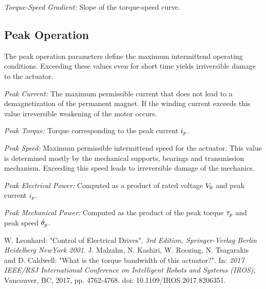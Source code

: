 \documentclass[a4paper,10pt]{cjtdsheet}      %
\begin{document}
\begin{multicols}{2}
\emph{Torque-Speed Gradient:} Slope of the torque-speed curve.

%
%
\subsection*{Peak Operation}
The peak operation parameters define the maximum intermittend operating conditions. Exceeding these values even for short time yields irriversible damage to the actuator.

\emph{Peak Current:} The maximum permissible current that does not lead to a demagnetization of the permanent magnet. If the winding current exceeds this value irreversible weakening of the motor occurs.

\emph{Peak Torque:} Torque corresponding to the peak current $i_p$.

\emph{Peak Speed:} Maximum permissible intermittend speed for the actuator. This value is determined mostly by the mechanical supports, bearings and transmission mechanism. Exceeding this speed leads to irreversible damage of the mechanics.

\emph{Peak Electrical Power:} Computed as a product of rated voltage $V_0$ and peak current $i_p$.

\emph{Peak Mechanical Power:} Computed as the product of the peak torque $\tau_p$ and peak speed $\dot{\theta}_p$.

\end{multicols}





\begin{thebibliography}{99}
%
W. Leonhard: 
\newblock "Control of Electrical Drives". 
\newblock \textit{3rd Edition, Springer-Verlag Berlin Heidelberg NewYork 2001}.
%
J. Malzahn, N. Kashiri, W. Roozing, N. Tsagarakis and D. Caldwell: 
\newblock "What is the torque bandwidth of this actuator?". 
\newblock In: \textit{2017 IEEE/RSJ International Conference on Intelligent Robots and Systems (IROS)}, Vancouver, BC, 2017, pp. 4762-4768. doi: 10.1109/IROS.2017.8206351.
%
\end{thebibliography}
\end{document}
